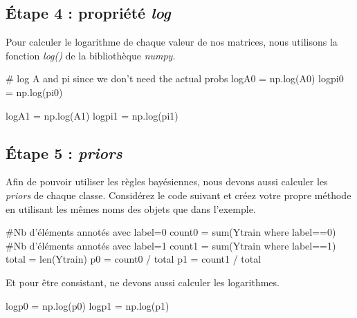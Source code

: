 
\subsection{Étape 4 : propriété \textit{log}}

Pour calculer le logarithme de chaque valeur de nos matrices, nous utilisons la fonction \textit{log()} de la bibliothèque \textit{numpy}.
\begin{python}
# log A and pi since we don't need the actual probs
logA0 = np.log(A0)
logpi0 = np.log(pi0)

logA1 = np.log(A1)
logpi1 = np.log(pi1)
\end{python}

\subsection{Étape 5 : \textit{priors}}

Afin de pouvoir utiliser les règles bayésiennes, nous devons aussi calculer les \textit{priors} de chaque classe. Considérez le code suivant et créez votre propre méthode en utilisant les mêmes noms des objets que dans l'exemple.

\begin{python}
#Nb d'éléments annotés avec label=0
count0 = sum(Ytrain where label==0)
#Nb d'éléments annotés avec label=1
count1 = sum(Ytrain where label==1)
total = len(Ytrain)
p0 = count0 / total
p1 = count1 / total
\end{python}


Et pour être consistant, ne devons aussi calculer les logarithmes.

\begin{python}
logp0 = np.log(p0)
logp1 = np.log(p1)
\end{python}
